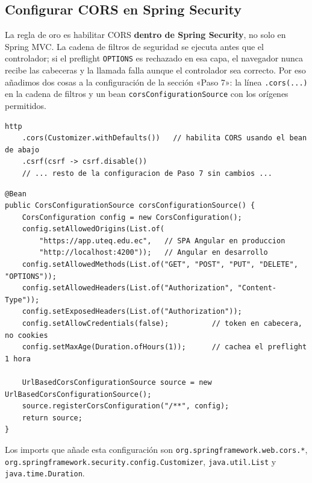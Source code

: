 \documentclass[11pt]{article}
\begin{document}
\subsection{Configurar CORS en Spring Security}
La regla de oro es habilitar CORS \textbf{dentro de Spring Security}, no solo en Spring MVC. La cadena de filtros de seguridad se ejecuta antes que el controlador; si el preflight \texttt{OPTIONS} es rechazado en esa capa, el navegador nunca recibe las cabeceras y la llamada falla aunque el controlador sea correcto. Por eso añadimos dos cosas a la configuración de la sección «Paso 7»: la línea \texttt{.cors(...)} en la cadena de filtros y un bean \texttt{corsConfigurationSource} con los orígenes permitidos.

\begin{cajacodigo}
\begin{lstlisting}[style=java]
http
    .cors(Customizer.withDefaults())   // habilita CORS usando el bean de abajo
    .csrf(csrf -> csrf.disable())
    // ... resto de la configuracion de Paso 7 sin cambios ...
\end{lstlisting}
\end{cajacodigo}

\begin{cajacodigo}
\begin{lstlisting}[style=java]
@Bean
public CorsConfigurationSource corsConfigurationSource() {
    CorsConfiguration config = new CorsConfiguration();
    config.setAllowedOrigins(List.of(
        "https://app.uteq.edu.ec",   // SPA Angular en produccion
        "http://localhost:4200"));   // Angular en desarrollo
    config.setAllowedMethods(List.of("GET", "POST", "PUT", "DELETE", "OPTIONS"));
    config.setAllowedHeaders(List.of("Authorization", "Content-Type"));
    config.setExposedHeaders(List.of("Authorization"));
    config.setAllowCredentials(false);          // token en cabecera, no cookies
    config.setMaxAge(Duration.ofHours(1));      // cachea el preflight 1 hora

    UrlBasedCorsConfigurationSource source = new UrlBasedCorsConfigurationSource();
    source.registerCorsConfiguration("/**", config);
    return source;
}
\end{lstlisting}
\end{cajacodigo}

Los imports que añade esta configuración son \texttt{org.\allowbreak{}springframework.\allowbreak{}web.\allowbreak{}cors.*}, \texttt{org.\allowbreak{}springframework.\allowbreak{}security.\allowbreak{}config.\allowbreak{}Customizer}, \texttt{java.\allowbreak{}util.\allowbreak{}List} y \texttt{java.\allowbreak{}time.\allowbreak{}Duration}.
\end{document}
